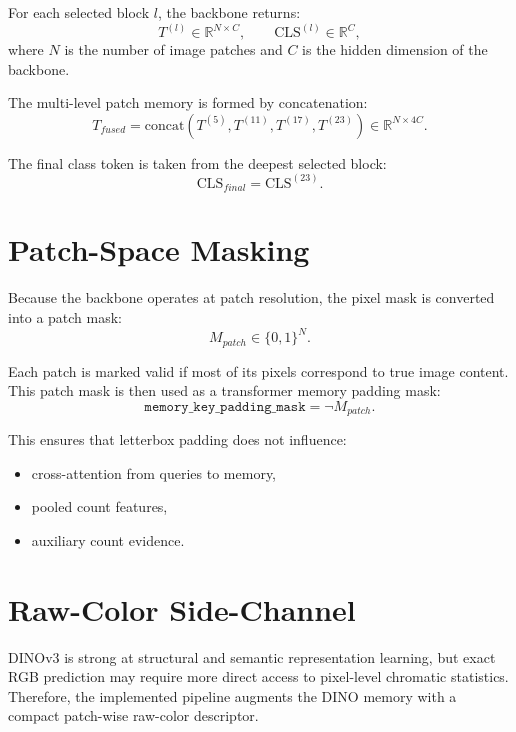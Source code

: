 \documentclass[11pt,a4paper]{article}
\begin{document}
For each selected block $l$, the backbone returns:
\begin{equation}
T^{(l)} \in \mathbb{R}^{N \times C}, \qquad \text{CLS}^{(l)} \in \mathbb{R}^{C},
\end{equation}
where $N$ is the number of image patches and $C$ is the hidden dimension of the backbone.

The multi-level patch memory is formed by concatenation:
\begin{equation}
T_{fused} = \text{concat}\left(T^{(5)}, T^{(11)}, T^{(17)}, T^{(23)}\right) \in \mathbb{R}^{N \times 4C}.
\end{equation}

The final class token is taken from the deepest selected block:
\begin{equation}
\text{CLS}_{final} = \text{CLS}^{(23)}.
\end{equation}

\section{Patch-Space Masking}

Because the backbone operates at patch resolution, the pixel mask is converted into a patch mask:
\begin{equation}
M_{patch} \in \{0,1\}^{N}.
\end{equation}

Each patch is marked valid if most of its pixels correspond to true image content. This patch mask is then used as a transformer memory padding mask:
\begin{equation}
\texttt{memory\_key\_padding\_mask} = \neg M_{patch}.
\end{equation}

This ensures that letterbox padding does not influence:
\begin{itemize}[leftmargin=2em]
    \item cross-attention from queries to memory,
    \item pooled count features,
    \item auxiliary count evidence.
\end{itemize}

\section{Raw-Color Side-Channel}

DINOv3 is strong at structural and semantic representation learning, but exact RGB prediction may require more direct access to pixel-level chromatic statistics. Therefore, the implemented pipeline augments the DINO memory with a compact patch-wise raw-color descriptor.
\end{document}
